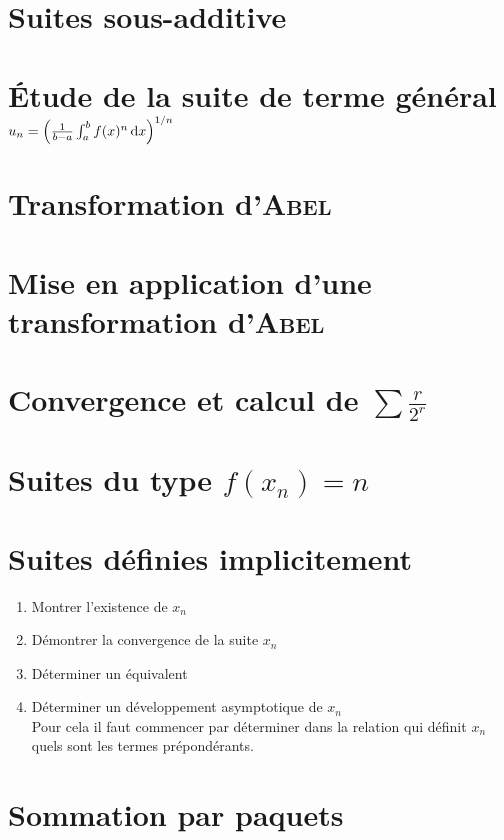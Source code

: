 \section{Suites sous-additive}


\section{Étude de la suite de terme général \texorpdfstring{$u_n = \left( \frac{1}{b-a} \int_{a}^{b} f(x)^n \, \mathrm{d} x \right)^{1/n}$}{égal à une intégrale}}


\section{Transformation d'\textsc{Abel}} \label{transformation_abel}


\section{Mise en application d'une transformation d'\textsc{Abel}}


\section{Convergence et calcul de  \texorpdfstring{$\sum \frac{r}{2^r}$}{de la série de terme général r/2^r}}


\section{Suites du type \texorpdfstring{$f(x_n) = n$}{f(x_n) = n}}


\section{Suites définies implicitement}

\begin{methode}
    \begin{enumerate}
        \item Montrer l'existence de $x_n$
        \item Démontrer la convergence de la suite $x_n$
        \item Déterminer un équivalent 
        \item Déterminer un développement asymptotique de $x_n$ \\
        Pour cela il faut commencer par déterminer dans la relation qui définit $x_n$ quels sont les termes prépondérants. 
    \end{enumerate}
\end{methode}

\section{Sommation par paquets}
